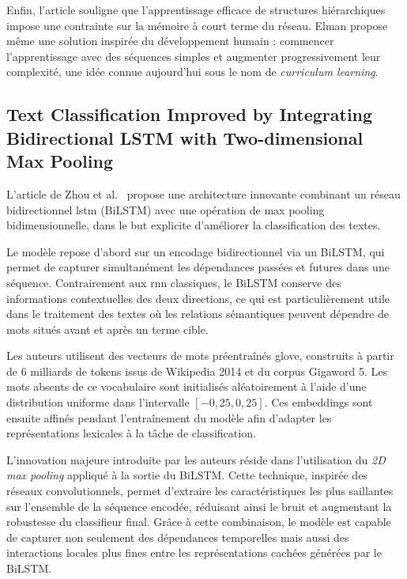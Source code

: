 \documentclass[12pt]{report}
\begin{document}
Enfin, l’article souligne que l’apprentissage efficace de structures hiérarchiques impose une contrainte sur la mémoire à court terme du réseau. Elman propose même une solution inspirée du développement humain : commencer l’apprentissage avec des séquences simples et augmenter progressivement leur complexité, une idée connue aujourd’hui sous le nom de \textit{curriculum learning}.

\subsection{Text Classification Improved by Integrating Bidirectional LSTM with Two-dimensional Max Pooling}

L’article de Zhou et al.~\cite{zhou2015text} propose une architecture innovante combinant un réseau bidirectionnel \gls{lstm} (BiLSTM) avec une opération de max pooling bidimensionnelle, dans le but explicite d'améliorer la classification des textes.

Le modèle repose d'abord sur un encodage bidirectionnel via un BiLSTM, qui permet de capturer simultanément les dépendances passées et futures dans une séquence. Contrairement aux \gls{rnn} classiques, le BiLSTM conserve des informations contextuelles des deux directions, ce qui est particulièrement utile dans le traitement des textes où les relations sémantiques peuvent dépendre de mots situés avant et après un terme cible.

Les auteurs utilisent des vecteurs de mots préentraînés \gls{glove}, construits à partir de 6 milliards de tokens issus de Wikipedia 2014 et du corpus Gigaword 5. Les mots absents de ce vocabulaire sont initialisés aléatoirement à l’aide d’une distribution uniforme dans l’intervalle $[-0{,}25, 0{,}25]$. Ces embeddings sont ensuite affinés pendant l’entraînement du modèle afin d’adapter les représentations lexicales à la tâche de classification.

L’innovation majeure introduite par les auteurs réside dans l’utilisation du \textit{2D max pooling} appliqué à la sortie du BiLSTM. Cette technique, inspirée des réseaux convolutionnels, permet d’extraire les caractéristiques les plus saillantes sur l’ensemble de la séquence encodée, réduisant ainsi le bruit et augmentant la robustesse du classifieur final. Grâce à cette combinaison, le modèle est capable de capturer non seulement des dépendances temporelles mais aussi des interactions locales plus fines entre les représentations cachées générées par le BiLSTM.
\end{document}
